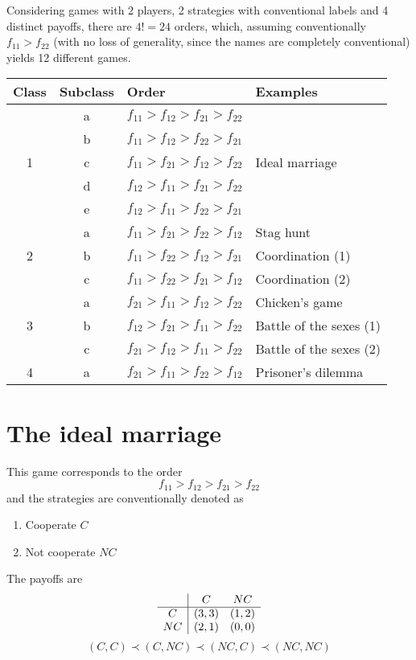 Considering games with 2 players, 2 strategies with conventional labels and 4 distinct payoffs, there are $4! = 24$ orders, which, assuming conventionally $f_{11} > f_{22}$ (with no loss of generality, since the names are completely conventional) yields 12 different games.

\begin{center}
	\renewcommand{\arraystretch}{1.2}
	\begin{tabular}{c|c|l|l}
		
		Class & Subclass & Order & Examples \\ \hline
		\multirow{5}{*}{1}
		& a & \(f_{11} > f_{12} > f_{21} > f_{22}\) & \multirow{5}{*}{Ideal marriage} \\ 
		& b & \(f_{11} > f_{12} > f_{22} > f_{21}\) & \\ 
		& c & \(f_{11} > f_{21} > f_{12} > f_{22}\) & \\ 
		& d & \(f_{12} > f_{11} > f_{21} > f_{22}\) & \\ 
		& e & \(f_{12} > f_{11} > f_{22} > f_{21}\) & \\ \hline
		\multirow{3}{*}{2}
		& a & \(f_{11} > f_{21} > f_{22} > f_{12}\) & Stag hunt \\ 
		& b & \(f_{11} > f_{22} > f_{12} > f_{21}\) & Coordination (1) \\
		& c & \(f_{11} > f_{22} > f_{21} > f_{12}\) & Coordination (2) \\ \hline
		\multirow{3}{*}{3}
		& a & \(f_{21} > f_{11} > f_{12} > f_{22}\) & Chicken's game \\ 
		& b & \(f_{12} > f_{21} > f_{11} > f_{22}\) & Battle of the sexes (1) \\
		& c & \(f_{21} > f_{12} > f_{11} > f_{22}\) & Battle of the sexes (2) \\ \hline
		4 & a & \(f_{21} > f_{11} > f_{22} > f_{12}\) & Prisoner's dilemma \\ 
	\end{tabular}
\end{center}

\section{The ideal marriage}

This game corresponds to the order
$$ f_{11} > f_{12} > f_{21} > f_{22} $$
and the strategies are conventionally denoted as
\begin{enumerate}
	\item Cooperate $C$
	
	\item Not cooperate $NC$
\end{enumerate}
The payoffs are
$$
\begin{array}{c | c c}
	& C & NC \\
	\hline
	C & (3,3) & (1, 2) \\
	NC & (2,1) & (0,0)
\end{array}
$$
$$ (C, C) \prec (C, NC) \prec (NC, C) \prec (NC, NC) $$

